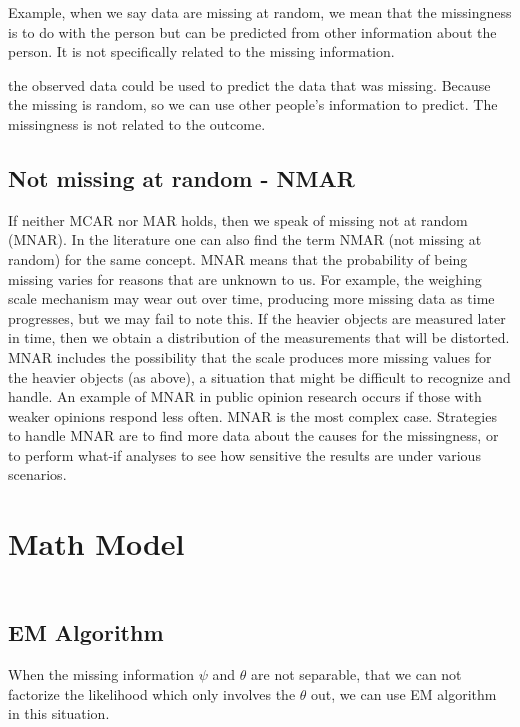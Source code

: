 Example, when we say data are missing at random, we mean that the missingness is to do with the person but can be predicted from other information about the person. It is not specifically related to the missing information. 

the observed data could be used to predict the data that was missing. Because the missing is random, so we can use other people's information to predict. The missingness is not related to the outcome.

\subsection{Not missing at random - NMAR}

If neither MCAR nor MAR holds, then we speak of missing not at random (MNAR). In the literature one can also find the term NMAR (not missing at random) for the same concept. MNAR means that the probability of being missing varies for reasons that are unknown to us. For example, the weighing scale mechanism may wear out over time, producing more missing data as time progresses, but we may fail to note this. If the heavier objects are measured later in time, then we obtain a distribution of the measurements that will be distorted. MNAR includes the possibility that the scale produces more missing values for the heavier objects (as above), a situation that might be difficult to recognize and handle. An example of MNAR in public opinion research occurs if those with weaker opinions respond less often. MNAR is the most complex case. Strategies to handle MNAR are to find more data about the causes for the missingness, or to perform what-if analyses to see how sensitive the results are under various scenarios.


\section{Math Model}
\begin{align*}
	
\end{align*}

\subsection{EM Algorithm}

When the missing information $\psi$ and $\theta$ are not separable, that we can not factorize the likelihood which only involves the $\theta$ out, we can use EM algorithm in this situation.

